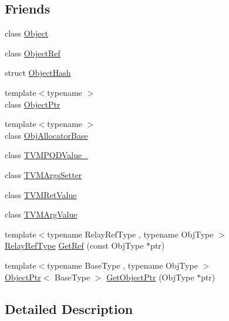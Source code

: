 \subsection*{Friends}
\begin{DoxyCompactItemize}
\item 
class \hyperlink{classtvm_1_1runtime_1_1ObjectPtr_a0720b5f434e636e22a3ed34f847eec57}{Object}
\item 
class \hyperlink{classtvm_1_1runtime_1_1ObjectPtr_a5d7d1b555fd908e511caa42bd7ccfc71}{Object\+Ref}
\item 
struct \hyperlink{classtvm_1_1runtime_1_1ObjectPtr_a7191cb82e9344bec1b5fd20f45b289f1}{Object\+Hash}
\item 
{\footnotesize template$<$typename $>$ }\\class \hyperlink{classtvm_1_1runtime_1_1ObjectPtr_a4193bb155125953e77ded93c0fb46965}{Object\+Ptr}
\item 
{\footnotesize template$<$typename $>$ }\\class \hyperlink{classtvm_1_1runtime_1_1ObjectPtr_a8fae619f3bd1a2b2f7273d8d6525032a}{Obj\+Allocator\+Base}
\item 
class \hyperlink{classtvm_1_1runtime_1_1ObjectPtr_a9a9fd94393cfd7d4b6e6029348e3e19a}{T\+V\+M\+P\+O\+D\+Value\+\_\+}
\item 
class \hyperlink{classtvm_1_1runtime_1_1ObjectPtr_a35ae555d4becf356b16aeacd353d41ee}{T\+V\+M\+Args\+Setter}
\item 
class \hyperlink{classtvm_1_1runtime_1_1ObjectPtr_ae0ea8b4adc6dab8c74086bceaef6b3e1}{T\+V\+M\+Ret\+Value}
\item 
class \hyperlink{classtvm_1_1runtime_1_1ObjectPtr_a7e8b2c6a4fde079ee813c425d2eb6b24}{T\+V\+M\+Arg\+Value}
\item 
{\footnotesize template$<$typename Relay\+Ref\+Type , typename Obj\+Type $>$ }\\\hyperlink{classtvm_1_1RelayRefType}{Relay\+Ref\+Type} \hyperlink{classtvm_1_1runtime_1_1ObjectPtr_a4365e69ddcc4d8c13904852391b99268}{Get\+Ref} (const Obj\+Type $\ast$ptr)
\item 
{\footnotesize template$<$typename Base\+Type , typename Obj\+Type $>$ }\\\hyperlink{classtvm_1_1runtime_1_1ObjectPtr}{Object\+Ptr}$<$ Base\+Type $>$ \hyperlink{classtvm_1_1runtime_1_1ObjectPtr_a2d849c83a86bbe7e86022b3d6cfc5ee4}{Get\+Object\+Ptr} (Obj\+Type $\ast$ptr)
\end{DoxyCompactItemize}


\subsection{Detailed Description}
